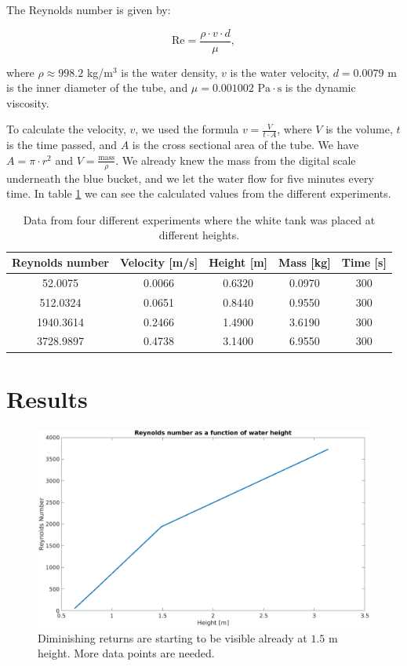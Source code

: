 \documentclass[english,a4paper,12pt]{article}
\begin{document}
The Reynolds number is given by:

$$\text{Re} = \frac{\rho \cdot v \cdot d}{\mu},$$

where $\rho \approx 998.2$ kg/m$^3$ is the water density, $v$ is the water velocity, $d = 0.0079$ m is the inner diameter of the tube, and $\mu = 0.001002 \text{ Pa} \cdot \text{s}$ is the dynamic viscosity. \smallskip

To calculate the velocity, $v$, we used the formula $v=\frac{V}{t\cdot A}$, where $V$ is the volume, $t$ is the time passed, and $A$ is the cross sectional area of the tube. We have $A=\pi \cdot r^2$ and $V=\frac{\text{mass}}{\rho}$. We already knew the mass from the digital scale underneath the blue bucket, and we let the water flow for five minutes every time. In table \ref{tab:1} we can see the calculated values from the different experiments.

\begin{table}[h!]
    \centering
    \begin{tabular}{|c|c|c|c|c|}\hline
    Reynolds number & Velocity [m/s] & Height [m] & Mass [kg] & Time [s] \\ \hline
    52.0075 & 0.0066 & 0.6320 & 0.0970 & 300\\ \hline
    512.0324 & 0.0651 & 0.8440 & 0.9550 & 300\\ \hline
    1940.3614 & 0.2466 & 1.4900 & 3.6190 & 300\\ \hline
    3728.9897 & 0.4738 & 3.1400 & 6.9550 & 300\\ \hline
    \end{tabular}
    \caption{Data from four different experiments where the white tank was placed at different heights.}
    \label{tab:1}
\end{table}

\section*{Results}

\begin{figure}[H]
    \centering
    \includegraphics[width=180mm]{ReVsHeightPlot.png}
    \caption{Diminishing returns are starting to be visible already at $1.5$ m height. More data points are needed.}
    \label{fig:2}
\end{figure}
\end{document}
